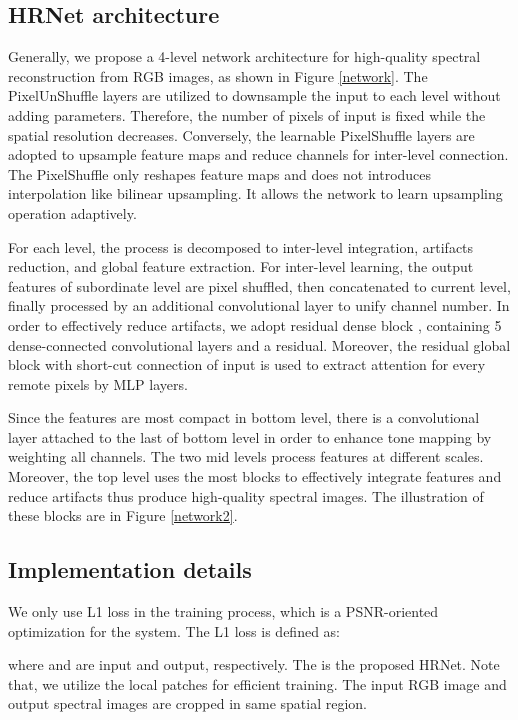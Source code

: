 \documentclass[10pt,twocolumn,letterpaper]{article}
\begin{document}
\subsection{HRNet architecture}

Generally, we propose a 4-level network architecture for high-quality spectral reconstruction from RGB images, as shown in Figure \ref{network}. The PixelUnShuffle layers \cite{shi2016real} are utilized to downsample the input to each level without adding parameters. Therefore, the number of pixels of input is fixed while the spatial resolution decreases. Conversely, the learnable PixelShuffle layers are adopted to upsample feature maps and reduce channels for inter-level connection. The PixelShuffle only reshapes feature maps and does not introduces interpolation like bilinear upsampling. It allows the network to learn upsampling operation adaptively.

For each level, the process is decomposed to inter-level integration, artifacts reduction, and global feature extraction. For inter-level learning, the output features of subordinate level are pixel shuffled, then concatenated to current level, finally processed by an additional convolutional layer to unify channel number. In order to effectively reduce artifacts, we adopt residual dense block \cite{he2016deep, huang2017densely}, containing 5 dense-connected convolutional layers and a residual. Moreover, the residual global block \cite{he2016deep, hu2018squeeze} with short-cut connection of input is used to extract attention for every remote pixels by MLP layers.

Since the features are most compact in bottom level, there is a  convolutional layer attached to the last of bottom level in order to enhance tone mapping by weighting all channels. The two mid levels process features at different scales. Moreover, the top level uses the most blocks to effectively integrate features and reduce artifacts thus produce high-quality spectral images. The illustration of these blocks are in Figure \ref{network2}.

\subsection{Implementation details}

We only use L1 loss in the training process, which is a PSNR-oriented optimization for the system. The L1 loss is defined as:


where  and  are input and output, respectively. The  is the proposed HRNet. Note that, we utilize the local patches for efficient training. The input RGB image and output spectral images are cropped in same spatial region.
\end{document}
